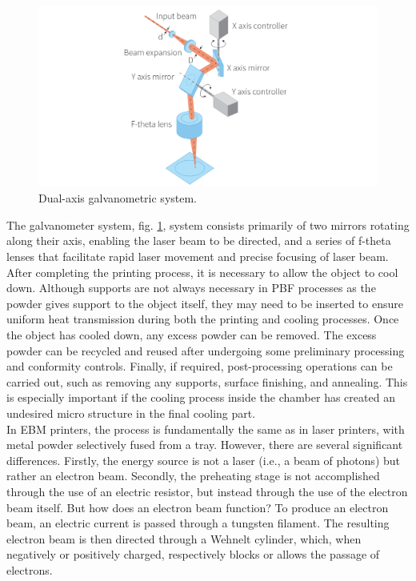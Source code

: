 \begin{figure}[H]
    \centering
    \includegraphics[scale=0.5]{Images/galvanometro.png}
    \caption[Galvanometric system.]{Dual-axis galvanometric system.}
    \label{fig:galvano}
\end{figure}
The galvanometer system, fig. \ref{fig:galvano}, system consists primarily of two mirrors rotating along their axis, enabling the laser beam to be directed, and a series of f-theta lenses that facilitate rapid laser movement and precise focusing of laser beam. After completing the printing process, it is necessary to allow the object to cool down. Although supports are not always necessary in PBF processes as the powder gives support to the object itself, they may need to be inserted to ensure uniform heat transmission during both the printing and cooling processes. Once the object has cooled down, any excess powder can be removed. The excess powder can be recycled and reused after undergoing some preliminary processing and conformity controls. Finally, if required, post-processing operations can be carried out, such as removing any supports, surface finishing, and annealing. This is especially important if the cooling process inside the chamber has created an undesired micro structure in the final cooling part.\\
In EBM printers, the process is fundamentally the same as in laser printers, with metal powder selectively fused from a tray. However, there are several significant differences. Firstly, the energy source is not a laser (i.e., a beam of photons) but rather an electron beam. Secondly, the preheating stage is not accomplished through the use of an electric resistor, but instead through the use of the electron beam itself. But how does an electron beam function? To produce an electron beam, an electric current is passed through a tungsten filament. The resulting electron beam is then directed through a Wehnelt cylinder, which, when negatively or positively charged, respectively blocks or allows the passage of electrons.

